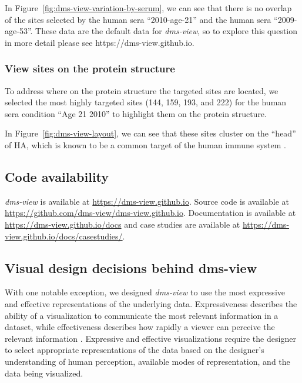 In Figure~\ref{fig:dms-view-variation-by-serum}, we can see that there is no overlap of the sites selected by the human sera ``2010-age-21'' and the human sera ``2009-age-53''.
These data are the default data for \emph{dms-view}, so to explore this question in more detail please see https://dms-view.github.io.

\subsubsection{View sites on the protein structure}

To address where on the protein structure the targeted sites are located, we selected the most highly targeted sites (144, 159, 193, and 222) for the human sera condition ``Age 21 2010'' to highlight them on the protein structure.

In Figure~\ref{fig:dms-view-layout}, we can see that these sites cluster on the ``head'' of HA, which is known to be a common target of the human immune system \citep{Chambers:2015jt}.

\subsection{Code availability}

\emph{dms-view} is available at \url{https://dms-view.github.io}.
Source code is available at \url{https://github.com/dms-view/dms-view.github.io}.
Documentation is available at \url{https://dms-view.github.io/docs} and case studies are available at \url{https://dms-view.github.io/docs/casestudies/}.

\subsection{Visual design decisions behind dms-view}
\label{subsec:visual-design-decisions}

With one notable exception, we designed \emph{dms-view} to use the most expressive and effective representations of the underlying data.
Expressiveness describes the ability of a visualization to communicate the most relevant information in a dataset, while effectiveness describes how rapidly a viewer can perceive the relevant information \citep{Mackinlay1986}.
Expressive and effective visualizations require the designer to select appropriate representations of the data based on the designer's understanding of human perception, available modes of representation, and the data being visualized.

